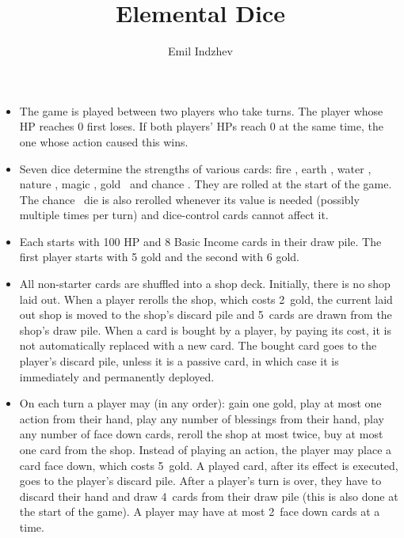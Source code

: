 \documentclass[dvipsnames,parskip,a4paper]{scrartcl}
\title{Elemental Dice}
\author{Emil Indzhev}
\newcommand{\iconsize}{3.4mm}
\newcommand{\icondepth}{0.45mm}
\newcommand{\icon}[1]{\raisebox{-\icondepth}{\texttt{[image:  \#1 ]}}}
\newcommand{\fire}{\icon{icons/fire.png}}
\newcommand{\earth}{\icon{icons/earth.png}}
\newcommand{\water}{\icon{icons/water.png}}
\newcommand{\nature}{\icon{icons/nature.png}}
\newcommand{\magic}{\icon{icons/magic.png}}
\newcommand{\gold}{\icon{icons/gold.png}}
\newcommand{\chance}{\icon{icons/chance.png}}
\newcommand{\rerollcost}{2}
\newcommand{\facedowncost}{5}
\newcommand{\handsize}{4}
\newcommand{\dacedownsize}{2}
\newcommand{\shopsize}{5}
\begin{document}
\maketitle

\begin{itemize}

\item

The game is played between two players who take turns. The player whose HP reaches 0 first loses. If both players' HPs reach 0 at the same time, the one whose action caused this wins.

\item

Seven dice determine the strengths of various cards: fire \fire, earth \earth, water \water, nature \nature, magic \magic, gold \gold \ and chance \chance. They are rolled at the start of the game. The chance \chance \ die is also rerolled whenever its value is needed (possibly multiple times per turn) and dice-control cards cannot affect it.

\item

Each starts with 100 HP and 8 Basic Income cards in their draw pile. The first player starts with 5 gold and the second with 6 gold.

\item

All non-starter cards are shuffled into a shop deck. Initially, there is no shop laid out. When a player rerolls the shop, which costs \rerollcost \ gold, the current laid out shop is moved to the shop's discard pile and \shopsize \ cards are drawn from the shop's draw pile. When a card is bought by a player, by paying its cost, it is not automatically replaced with a new card. The bought card goes to the player's discard pile, unless it is a passive card, in which case it is immediately and permanently deployed.

\item

On each turn a player may (in any order): gain one gold, play at most one action from their hand, play any number of blessings from their hand, play any number of face down cards, reroll the shop at most twice, buy at most one card from the shop. Instead of playing an action, the player may place a card face down, which costs \facedowncost \ gold. A played card, after its effect is executed, goes to the player's discard pile. After a player's turn is over, they have to discard their hand and draw \handsize \ cards from their draw pile (this is also done at the start of the game). A player may have at most \dacedownsize \ face down cards at a time.


\end{itemize}
\end{document}
